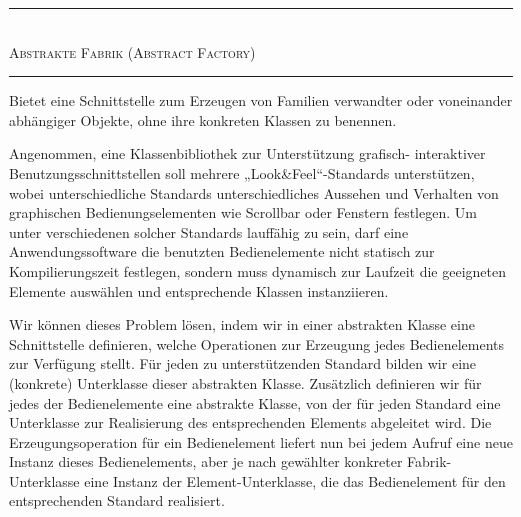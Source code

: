 \vspace{\baselineskip}
\textcolor{FernUni-MI-green}{\noindent\rule[1ex]{\textwidth}{2pt}}\\
{\Large \textcolor{FernUni-MI-green}{\textsc{Abstrakte Fabrik (Abstract Factory)}}}\\
\textcolor{FernUni-MI-green}{\noindent\rule[1ex]{\textwidth}{2pt}}

\begin{description}
	\setlength{\itemsep}{2mm} %
	
	\item[Zweck] Bietet eine Schnittstelle zum Erzeugen von Familien verwandter oder voneinander abhängiger Objekte, ohne ihre konkreten Klassen zu benennen.
	\item[Motivation] Angenommen, eine Klassenbibliothek zur Unterstützung grafisch-
	\linebreak %
	interaktiver Benutzungsschnittstellen soll mehrere „Look\&Feel“-Standards unterstützen, wobei unterschiedliche Standards unterschiedliches Aussehen und Verhalten von graphischen Bedienungselementen wie \zb Scrollbar oder 
	\linebreak %
	Fenstern festlegen. Um unter verschiedenen solcher Standards lauffähig zu sein, darf eine Anwendungssoftware die benutzten Bedienelemente nicht statisch zur Kompilierungszeit festlegen, sondern muss dynamisch zur Laufzeit die ge\-eigneten Elemente auswählen und entsprechende Klassen instanziieren.
	
\pagebreak %

	Wir können dieses Problem lösen, indem wir in einer abstrakten Klasse eine Schnittstelle definieren, welche Operationen zur Erzeugung jedes Bedien\-elements zur Verfügung stellt. Für jeden zu unterstützenden Standard bilden wir eine (konkrete) Unterklasse dieser abstrakten Klasse. Zusätzlich definieren wir für jedes der Bedienelemente eine abstrakte Klasse, von der für jeden Standard eine Unterklasse zur Realisierung des entsprechenden Elements abgeleitet wird. Die Erzeugungsoperation für ein Bedienelement liefert nun bei jedem Aufruf eine neue Instanz dieses Bedienelements, aber je nach gewählter konkreter Fabrik-Unterklasse eine Instanz der Element-Unterklasse, die das Bedienelement für den entsprechenden Standard realisiert.
	

\end{description}
